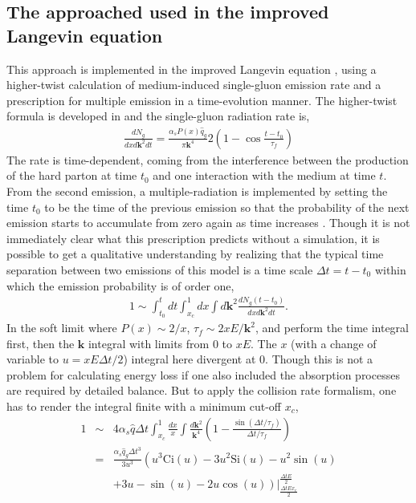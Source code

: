 \documentclass[aps, prc, reprint, amsmath, groupedaddress, nofootinbib]{revtex4-1}
\begin{document}
\subsection{The approached used in the improved Langevin equation}
This approach is implemented in the improved Langevin equation \cite{Cao:2013ita}, using a higher-twist calculation of medium-induced single-gluon emission rate and a prescription for multiple emission in a time-evolution manner.
The higher-twist formula is developed in \cite{PhysRevLett.85.3591,Majumder:2009ge} and the single-gluon radiation rate is,
\begin{eqnarray}
\frac{dN_g}{dx d\mathbf{k}^2 dt} = \frac{\alpha_s P(x)\hat{q}_g}{\pi \mathbf{k}^4} 2\left(1-\cos\frac{t-t_0}{\tau_f}\right)
\end{eqnarray}
The rate is time-dependent, coming from the interference between the production of the hard parton at time $t_0$ and one interaction with the medium at time $t$.
From the second emission, a multiple-radiation is implemented by setting the time $t_0$ to be the time of the previous emission so that the probability of the next emission starts to accumulate from zero again as time increases \cite{Cao:2013ita}.
Though it is not immediately clear what this prescription predicts without a simulation, it is possible to get a qualitative understanding by realizing that the typical time separation between two emissions of this model is a time scale $\Delta t = t-t_0$ within which the emission probability is of order one,
\begin{eqnarray}
1 \sim \int_{t_0}^{t} dt\int_{x_c}^1 dx \int d\mathbf{k}^2 \frac{dN_g(t-t_0)}{dx d\mathbf{k}^2 dt}.
\end{eqnarray}
In the soft limit where $P(x) \sim 2/x$, $\tau_f\sim 2xE/\mathbf{k}^2$, and perform the time integral first, then the $\mathbf{k}$ integral with limits from $0$ to $xE$.
The $x$ (with a change of variable to $u = xE\Delta t/2$) integral here divergent at 0.
Though this is not a problem for calculating energy loss if one also included the absorption processes are required by detailed balance.
But to apply the collision rate formalism, one has to render the integral finite with a minimum cut-off $x_c$,
\begin{eqnarray}
1 &\sim& 4\alpha_s\hat{q}\Delta t \int_{x_c}^1 \frac{dx}{x} \int \frac{d\mathbf{k}^2}{\mathbf{k}^4}\left(1-\frac{\sin(\Delta t/\tau_f)}{\Delta t/\tau_f}\right)\\
&=& \frac{\alpha_s\hat{q}_g \Delta t^3}{3u^3} \left( u^3\mathrm{Ci}(u)-3u^2\mathrm{Si}(u) - u^2 \sin(u) \right. \\\nonumber
&&\left. +3u-\sin(u) - 2u\cos(u) \right) \left.\right|_{\frac{\Delta t E x_c}{2}}^{\frac{\Delta t E}{2}} 
\end{eqnarray}
\end{document}
